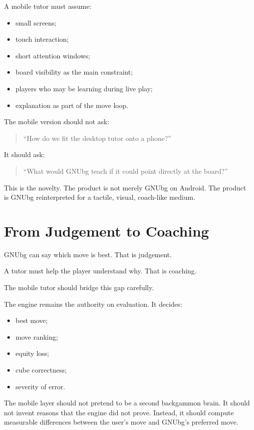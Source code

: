\documentclass[11pt,a4paper]{article}
\begin{document}
A mobile tutor must assume:

\begin{itemize}
  \item small screens;
  \item touch interaction;
  \item short attention windows;
  \item board visibility as the main constraint;
  \item players who may be learning during live play;
  \item explanation as part of the move loop.
\end{itemize}

The mobile version should not ask:

\begin{quote}
``How do we fit the desktop tutor onto a phone?''
\end{quote}

It should ask:

\begin{quote}
``What would GNUbg teach if it could point directly at the board?''
\end{quote}

This is the novelty. The product is not merely GNUbg on Android. The product is GNUbg reinterpreted for a tactile, visual, coach-like medium.

\section{From Judgement to Coaching}

GNUbg can say which move is best. That is judgement.

A tutor must help the player understand why. That is coaching.

The mobile tutor should bridge this gap carefully.

The engine remains the authority on evaluation. It decides:

\begin{itemize}
  \item best move;
  \item move ranking;
  \item equity loss;
  \item cube correctness;
  \item severity of error.
\end{itemize}

The mobile layer should not pretend to be a second backgammon brain. It should not invent reasons that the engine did not prove. Instead, it should compute measurable differences between the user's move and GNUbg's preferred move.
\end{document}
